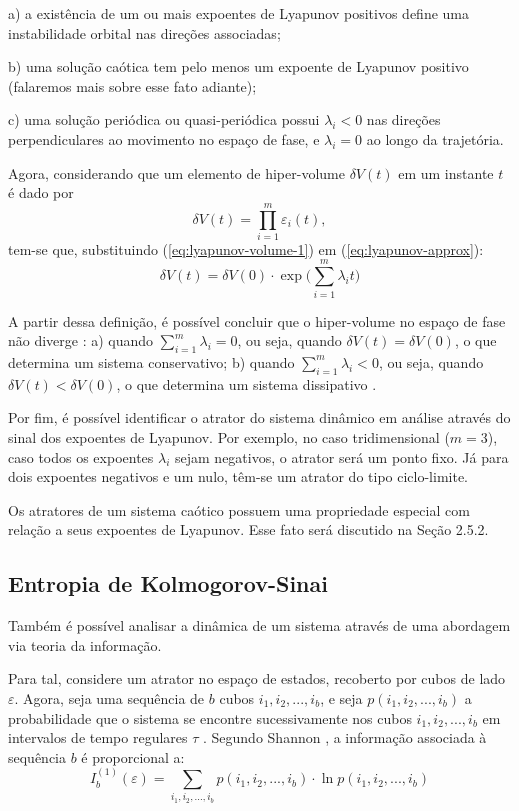 \documentclass[a4paper, 12pt]{article}
\begin{document}
a) a existência de um ou mais expoentes de Lyapunov positivos define uma instabilidade orbital nas direções associadas;

b) uma solução caótica tem pelo menos um expoente de Lyapunov positivo (falaremos mais sobre esse fato adiante);

c) uma solução periódica ou quasi-periódica possui $\lambda_i < 0$ nas direções perpendiculares ao movimento no espaço de fase, e $\lambda_i = 0$ ao longo da trajetória.

Agora, considerando que um elemento de hiper-volume $\delta V(t)$ em um instante $t$ é dado por
\begin{equation}\label{eq:lyapunov-volume-1}
\delta V(t) = \prod_{i=1}^{m} \varepsilon_i (t)\mathtt{,}
\end{equation}
tem-se que, substituindo (\ref{eq:lyapunov-volume-1}) em (\ref{eq:lyapunov-approx}):
\begin{equation}
\delta V(t) = \delta V(0) \cdot \exp \big(\sum_{i=1}^{m} \lambda_i t\big)
\end{equation}

A partir dessa definição, é possível concluir que o hiper-volume no espaço de fase não diverge : a) quando $\sum_{i=1}^{m} \lambda_i = 0$, ou seja, quando $\delta V(t) = \delta V(0)$, o que determina um sistema conservativo; b) quando $\sum_{i=1}^{m} \lambda_i < 0$, ou seja, quando $\delta V(t) < \delta V(0)$, o que determina um sistema dissipativo \cite{fiedler1994caos}.

Por fim, é possível identificar o atrator do sistema dinâmico em análise através do sinal dos expoentes de Lyapunov. Por exemplo, no caso tridimensional ($m=3$), caso todos os expoentes $\lambda_i$ sejam negativos, o atrator será um ponto fixo. Já para dois expoentes negativos e um nulo, têm-se um atrator do tipo ciclo-limite.

Os atratores de um sistema caótico possuem uma propriedade especial com relação a seus expoentes de Lyapunov. Esse fato será discutido na Seção 2.5.2.

\subsection{Entropia de Kolmogorov-Sinai}
Também é possível analisar a dinâmica de um sistema através de uma abordagem via teoria da informação.

Para tal, considere um atrator no espaço de estados, recoberto por cubos de lado $\varepsilon$. Agora, seja uma sequência de $b$ cubos $i_1, i_2, ..., i_b$, e seja $p(i_1, i_2, ..., i_b)$ a probabilidade que o sistema se encontre sucessivamente nos cubos $i_1, i_2, ..., i_b$ em intervalos de tempo regulares $\tau$ \cite{fiedler1994caos, attux2001dinamica}. Segundo Shannon  \cite{shannon1948mathematical}, a informação associada à sequência $b$ é proporcional a:
\begin{equation}
I_{b}^{(1)} (\varepsilon) = \sum_{i_1, i_2, ..., i_b} p(i_1, i_2, ..., i_b) \cdot \ln p(i_1, i_2, ..., i_b)
\end{equation}
\end{document}

